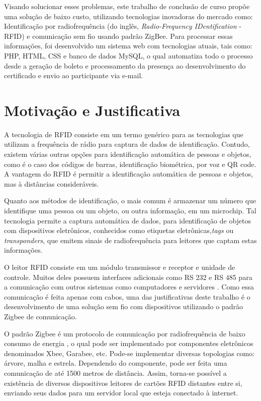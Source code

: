 \documentclass[tcc,capa]{texufpel}
\begin{document}
    Visando solucionar esses problemas, este trabalho de conclusão de curso propõe uma solução de baixo custo, utilizando tecnologias inovadoras do mercado como: Identificação por radiofrequência (do inglês, \textit{Radio-Frequency IDentification} - RFID) e comunicação sem fio usando padrão ZigBee. Para processar essas informações, foi desenvolvido um sistema web com tecnologias atuais, tais como: PHP, HTML, CSS e banco de dados MySQL, o qual automatiza todo o processo desde a geração de boleto e processamento da presença ao desenvolvimento do certificado e envio ao participante via e-mail.

    
    \section{Motivação e Justificativa}
    	
    
         A tecnologia de RFID consiste em um termo genérico para as tecnologias que utilizam a frequência de rádio para captura de dados de identificação. Contudo, existem várias outras opções para identificação automática de pessoas e objetos, como é o caso dos códigos de barras, identificação biométrica, por voz e QR code.  A vantagem do RFID é permitir a identificação automática de pessoas e objetos, mas à distâncias consideráveis.
    
        Quanto aos métodos de identificação, o mais comum é armazenar um número que identifique uma pessoa ou um objeto, ou outra informação, em um microchip. Tal tecnologia permite a captura automática de dados, para identificação de objetos com dispositivos eletrônicos, conhecidos como etiquetas eletrônicas,\textit{tags} ou \textit{transponders}, que emitem sinais de radiofrequência para leitores que captam estas informações.
         
        
        O leitor RFID consiste em um módulo transmissor e receptor e unidade de controle. Muitos deles possuem interfaces adicionais como RS 232 e RS 485 para a comunicação com outros sistemas como computadores e servidores \cite{finkenzeller1999rfid}. Como essa comunicação é feita apenas com cabos, uma das justificativas deste trabalho é o desenvolvimento de uma solução sem fio com dispositivos utilizando o padrão Zigbee de comunicação.
        
        O padrão Zigbee é um protocolo de comunicação por radiofrequência de baixo consumo de energia \cite{faludi2010building}, o qual pode ser implementado por componentes eletrônicos denominados Xbee, Garabee, etc. Pode-se implementar diversas topologias como: árvore, malha e estrela. Dependendo do componente, pode ser feita uma comunicação de até 1500 metros de distância. Assim, torna-se possível a existência de diversos dispositivos leitores de cartões RFID distantes entre si, enviando seus dados para um servidor local que esteja conectado à internet.
        
\end{document}
